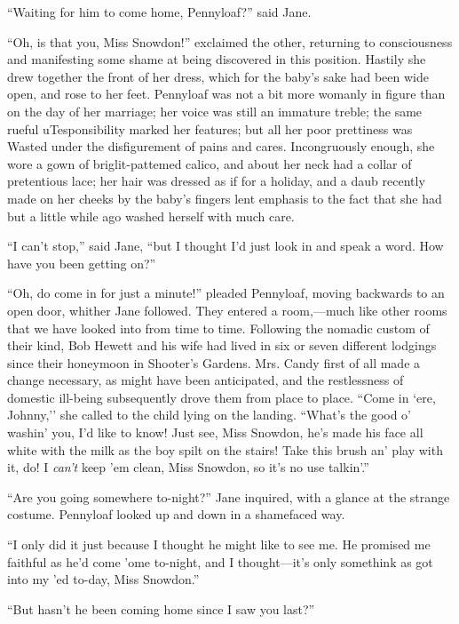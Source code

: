 ``Waiting for him to come home, Pennyloaf?'' said Jane.

``Oh, is that you, Miss Snowdon!'' exclaimed the other, returning to
consciousness and manifesting some shame at being discovered in this
position. Hastily she drew together the front of her dress, which for
the baby's sake had been wide open, and rose to her feet. Pennyloaf was
not a bit more womanly in figure than on the day of her marriage; her
voice was still an immature treble; the same rueful uTesponsibility
marked her features; but all her poor prettiness was {}Wasted under the
disfigurement of pains and cares. Incongruously enough, she wore a gown
of briglit-pattemed calico, and about her neck had a collar of
pretentious lace; her hair was dressed as if for a holiday, and a daub
recently made on her cheeks by the baby's fingers lent emphasis to the
fact that she had but a little while ago washed herself with much care.

``I can't stop,'' said Jane, ``but I thought I'd just look in and speak
a word. How have you been getting on?''

``Oh, do come in for just a minute!'' pleaded Pennyloaf, moving
backwards to an open door, whither Jane followed. They entered a
room,---much like other rooms that we have looked into from time to
time. Following the nomadic custom of their kind, Bob Hewett and his
wife had lived in six or seven different lodgings since their honeymoon
in Shooter's Gardens. Mrs. Candy first of all made a change necessary,
as might have been anticipated, and the restlessness of domestic
ill-being subsequently drove them {}from place to place. ``Come in `ere,
Johnny,'' she called to the child lying on the landing. ``What's the
good o' washin' you, I'd like to know! Just see, Miss Snowdon, he's made
his face all white with the milk as the boy spilt on the stairs! Take
this brush an' play with it, do! I \emph{can't} keep 'em clean, Miss
Snowdon, so it's no use talkin'.''

``Are you going somewhere to-night?'' Jane inquired, with a glance at
the strange costume. Pennyloaf looked up and down in a shamefaced way.

``I only did it just because I thought he might like to see me. He
promised me faithful as he'd come 'ome to-night, and I thought---it's
only somethink as got into my 'ed to-day, Miss Snowdon.''

``But hasn't he been coming home since I saw you last?''

